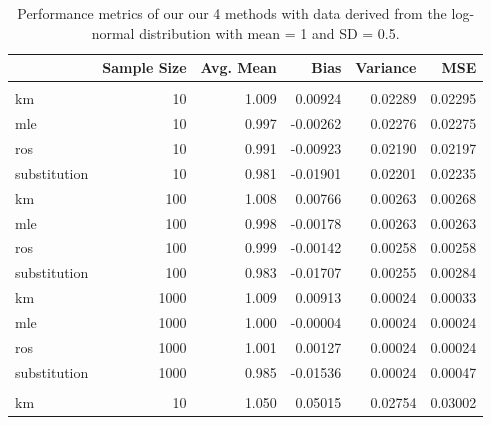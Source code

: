 \documentclass[12pt, twoside]{amherstthesis}
\begin{document}
\begin{table}

\caption{\label{tab:unnamed-chunk-1}Performance metrics of our our 
             4 methods with data derived from the log-normal 
             distribution with mean = 1 and SD = 0.5.}
\centering
\fontsize{11.5}{13.5}\selectfont
\begin{tabular}[t]{lrrrrr}
\toprule
  & Sample Size & Avg. Mean & Bias & Variance & MSE\\
\midrule
\addlinespace[0.3em]
\multicolumn{6}{l}{\textbf{Censoring Rate = 0.1}}\\
\hspace{1em}km & 10 & 1.009 & 0.00924 & 0.02289 & 0.02295\\
\hspace{1em}mle & 10 & 0.997 & -0.00262 & 0.02276 & 0.02275\\
\hspace{1em}ros & 10 & 0.991 & -0.00923 & 0.02190 & 0.02197\\
\hspace{1em}substitution & 10 & 0.981 & -0.01901 & 0.02201 & 0.02235\\
\hspace{1em}km & 100 & 1.008 & 0.00766 & 0.00263 & 0.00268\\
\hspace{1em}mle & 100 & 0.998 & -0.00178 & 0.00263 & 0.00263\\
\hspace{1em}ros & 100 & 0.999 & -0.00142 & 0.00258 & 0.00258\\
\hspace{1em}substitution & 100 & 0.983 & -0.01707 & 0.00255 & 0.00284\\
\hspace{1em}km & 1000 & 1.009 & 0.00913 & 0.00024 & 0.00033\\
\hspace{1em}mle & 1000 & 1.000 & -0.00004 & 0.00024 & 0.00024\\
\hspace{1em}ros & 1000 & 1.001 & 0.00127 & 0.00024 & 0.00024\\
\hspace{1em}substitution & 1000 & 0.985 & -0.01536 & 0.00024 & 0.00047\\
\addlinespace[1em]
\multicolumn{6}{l}{\textbf{Censoring Rate = 0.3}}\\
\hspace{1em}km & 10 & 1.050 & 0.05015 & 0.02754 & 0.03002\\

\end{tabular}
\end{table}
\end{document}
